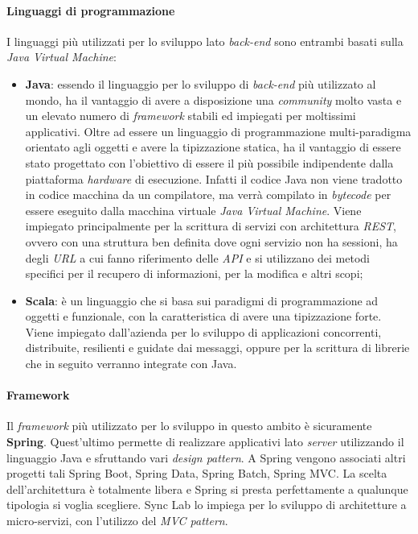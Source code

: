 \paragraph{Linguaggi di programmazione}
I linguaggi più utilizzati per lo sviluppo lato \textit{back-end} sono entrambi basati sulla \textit{Java Virtual Machine}:
\begin{itemize}
  \item \textbf{Java}: essendo il linguaggio per lo sviluppo di \textit{back-end} più utilizzato al mondo, ha il vantaggio di avere a disposizione una \textit{community} molto vasta e un elevato numero di \textit{framework} stabili ed impiegati per moltissimi applicativi. Oltre ad essere un linguaggio di programmazione multi-paradigma orientato agli oggetti e avere la tipizzazione statica, ha il vantaggio di essere stato progettato con l'obiettivo di essere il più possibile indipendente dalla piattaforma \textit{hardware} di esecuzione. Infatti il codice Java non viene tradotto in codice macchina da un compilatore, ma verrà compilato in \textit{bytecode} per essere eseguito dalla macchina virtuale \textit{Java Virtual Machine}. Viene impiegato principalmente per la scrittura di servizi con architettura \textit{REST}, ovvero con una struttura ben definita dove ogni servizio non ha sessioni, ha degli \textit{URL} a cui fanno riferimento delle \textit{API} e si utilizzano dei metodi specifici per il recupero di informazioni, per la modifica e altri scopi;
  
  \item \textbf{Scala}: è un linguaggio che si basa sui paradigmi di programmazione ad oggetti e funzionale, con la caratteristica di avere una tipizzazione forte. Viene impiegato dall'azienda per lo sviluppo di applicazioni concorrenti, distribuite, resilienti e guidate dai messaggi, oppure per la scrittura di librerie che in seguito verranno integrate con Java.
\end{itemize}

\paragraph{Framework} Il \textit{framework} più utilizzato per lo sviluppo in questo ambito è sicuramente \textbf{Spring}. Quest'ultimo permette di realizzare applicativi lato \textit{server} utilizzando il linguaggio Java e sfruttando vari \textit{design pattern}. A Spring vengono associati altri progetti tali Spring Boot, Spring Data, Spring Batch, Spring MVC. La scelta dell'architettura è totalmente libera e Spring si presta perfettamente a qualunque tipologia si voglia scegliere. 
Sync Lab lo impiega per lo sviluppo di architetture a micro-servizi, con l'utilizzo del \textit{MVC pattern}.


